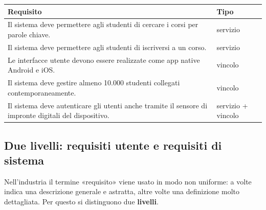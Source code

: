 \begin{table}[H]
\centering
\renewcommand{\arraystretch}{1.35}
\begin{tabularx}{\textwidth}{L >{\centering\arraybackslash}p{3.6cm}}
\toprule
Requisito & Tipo \\
\midrule
Il sistema deve permettere agli studenti di cercare i corsi per parole chiave. & servizio \\
Il sistema deve permettere agli studenti di iscriversi a un corso. & servizio \\
Le interfacce utente devono essere realizzate come app native Android e iOS. & vincolo \\
Il sistema deve gestire almeno 10.000 studenti collegati contemporaneamente. & vincolo \\
Il sistema deve autenticare gli utenti anche tramite il sensore di impronte digitali del dispositivo. & servizio + vincolo \\
\bottomrule
\end{tabularx}
\end{table}

\subsection{Due livelli: requisiti utente e requisiti di sistema}

Nell'industria il termine «requisito» viene usato in modo non uniforme: a volte indica una descrizione generale e astratta,
altre volte una definizione molto dettagliata. Per questo si distinguono due \textbf{livelli}.



